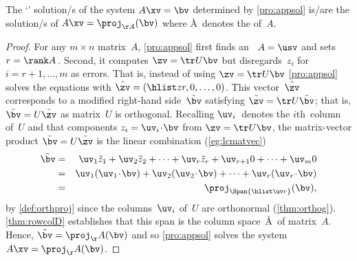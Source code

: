 \begin{theorem}[] \label{thm:lsqproj}
The `' solution/s of the system \(A\xv=\bv\) determined by \autoref{pro:appsol} is/are the solution/s of \(A\xv=\proj_{\AA}(\bv)\) where \AA~denotes the  of~\(A\).
\end{theorem}

\begin{proof} 
For any \(m\times n\) matrix~\(A\), \autoref{pro:appsol} first finds an \svd\ \(A=\usv\) and sets \(r=\rank A\)\,.
Second, it computes \(\zv=\tr U\bv\) but disregards~\(z_i\) for \(i=r+1,\ldots,m\) as errors.
That is, instead of using \(\zv=\tr U\bv\) \autoref{pro:appsol} solves the equations with \(\tilde\zv=(\hlist zr,0,\ldots,0)\). 
This vector~\(\tilde\zv\) corresponds to a modified right-hand side~\(\tilde\bv\) satisfying \(\tilde\zv=\tr U\tilde\bv\); that is, \(\tilde\bv=U\tilde\zv\) as matrix~\(U\) is orthogonal.
Recalling \(\uv_i\)~denotes the \(i\)th~column of~\(U\) and that components \(z_i=\uv_i\cdot\bv\) from  \(\zv=\tr U\bv\),
the matrix-vector product \(\tilde\bv=U\tilde\zv\) is the linear combination (\autoref{eg:lcmatvec})
\begin{eqnarray*}
\tilde\bv&=&\uv_1\tilde z_1+\uv_2\tilde z_2+\cdots+\uv_r\tilde z_r+\uv_{r+1}0+\cdots+\uv_m0
\\&=&\uv_1(\uv_1\cdot\bv)+\uv_2(\uv_2\cdot\bv)+\cdots+\uv_r(\uv_r\cdot\bv)
\\&=&\proj_{\Span\{\hlist\uv r\}}(\bv),
\end{eqnarray*}
by \autoref{def:orthproj} since the columns~\(\uv_i\) of~\(U\) are orthonormal (\autoref{thm:orthog}).
\autoref{thm:rowcolD} establishes that this span is the column space~\AA\ of matrix~\(A\).
Hence, \(\tilde\bv=\proj_\AA(\bv)\) and so \autoref{pro:appsol} solves the system \(A\xv=\proj_\AA(\bv)\).
\end{proof}



